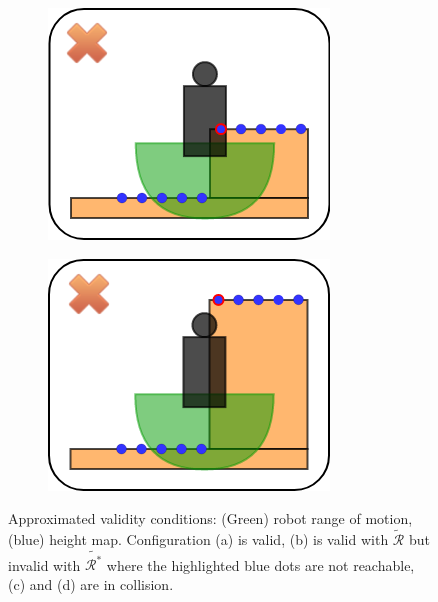 \begin{figure}
\begin{subfigure}[t]{.48\linewidth}
    \end{subfigure}
    \begin{subfigure}[t]{.48\linewidth}
    \includegraphics[width=\textwidth]{Figures/Chapter_LEAS/approx2.png}
    \caption{\label{fig:approximation_validity_2}}
    \end{subfigure}
    \begin{subfigure}[t]{.48\linewidth}
    \includegraphics[width=\textwidth]{Figures/Chapter_LEAS/approx3.png}
    \caption{\label{fig:approximation_validity_3}}
    \end{subfigure}
    \caption{Approximated validity conditions: (Green) robot range of motion, (blue) height map. Configuration (a) is valid, (b) is valid with $\tilde{\mathcal{R}}$ but invalid with $\tilde{\mathcal{R}^*}$ where the highlighted blue dots are not reachable, (c) and (d) are in collision.}
    \label{fig:approximation_validity}
\end{figure}

